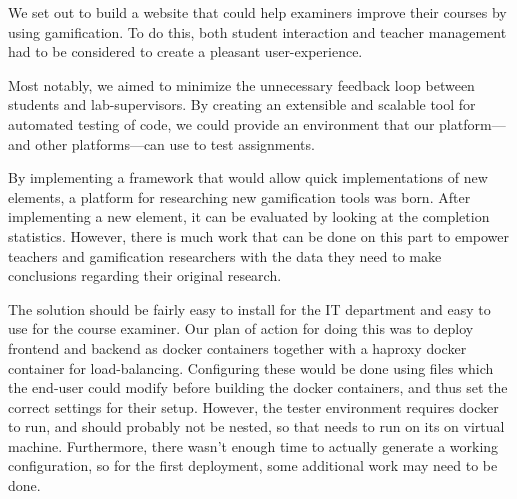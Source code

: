 We set out to build a website that could help examiners improve their courses by using gamification. To do this, both student interaction and teacher management had to be considered to create a pleasant user-experience.

Most notably, we aimed to minimize the unnecessary feedback loop between students and lab-supervisors. By creating an extensible and scalable tool for automated testing of code, we could provide an environment that our platform---and other platforms---can use to test assignments.

By implementing a framework that would allow quick implementations of new elements, a platform for researching new gamification tools was born. After implementing a new element, it can be evaluated by looking at the completion statistics. However, there is much work that can be done on this part to empower teachers and gamification researchers with the data they need to make conclusions regarding their original research.

The solution should be fairly easy to install for the IT department and easy to use for the course examiner. Our plan of action for doing this was to deploy frontend and backend as docker containers together with a haproxy docker container for load-balancing. Configuring these would be done using files which the end-user could modify before building the docker containers, and thus set the correct settings for their setup. However, the tester environment requires docker to run, and should probably not be nested, so that needs to run on its on virtual machine. Furthermore, there wasn't enough time to actually generate a working configuration, so for the first deployment, some additional work may need to be done.
